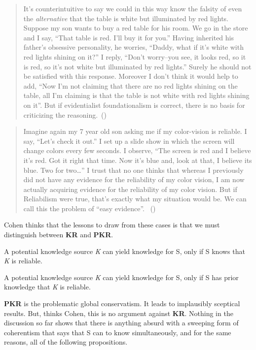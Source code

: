 \documentclass[
  10pt,
  letterpaper,
  twoside]{scrbook}
\providecommand{\tightlist}{%
  \setlength{\itemsep}{0pt}\setlength{\parskip}{0pt}}\usepackage{longtable,booktabs,array}
\begin{document}
\begin{quote}
It's counterintuitive to say we could in this way know the falsity of
even the \emph{alternative} that the table is white but illuminated by
red lights. Suppose my son wants to buy a red table for his room. We go
in the store and I say, ``That table is red. I'll buy it for you.''
Having inherited his father's obsessive personality, he worries,
``Daddy, what if it's white with red lights shining on it?'' I reply,
``Don't worry--you see, it looks red, so it is red, so it's not white
but illuminated by red lights.'' Surely he should not be satisfied with
this response. Moreover I don't think it would help to add, ``Now I'm
not claiming that there are no red lights shining on the table, all I'm
claiming is that the table is not white with red lights shining on it''.
But if evidentialist foundationalism is correct, there is no basis for
criticizing the reasoning.~()
\end{quote}

\begin{quote}
Imagine again my 7 year old son asking me if my color-vision is
reliable. I say, ``Let's check it out.'' I set up a slide show in which
the screen will change colors every few seconds. I observe, ``The screen
is red and I believe it's red. Got it right that time. Now it's blue
and, look at that, I believe its blue. Two for two\ldots{}'' I trust
that no one thinks that whereas I previously did not have any evidence
for the reliability of my color vision, I am now actually acquiring
evidence for the reliability of my color vision. But if Reliabilism were
true, that's exactly what my situation would be. We can call this the
problem of ``easy evidence''. ~()
\end{quote}

Cohen thinks that the lessons to draw from these cases is that we must
distinguish between \textbf{KR} and \textbf{PKR}.

\begin{description}
\tightlist
\item[KR]
A potential knowledge source \emph{K} can yield knowledge for S, only if
S knows that \emph{K} is reliable.
\item[PKR]
A potential knowledge source \emph{K} can yield knowledge for S, only if
S has prior knowledge that \emph{K} is reliable.
\end{description}

\textbf{PKR} is the problematic global conservatism. It leads to
implausibly sceptical results. But, thinks Cohen, this is no argument
against \textbf{KR}. Nothing in the discussion so far shows that there
is anything absurd with a sweeping form of coherentism that says that S
can to know simultaneously, and for the same reasons, all of the
following propositions.
\end{document}
